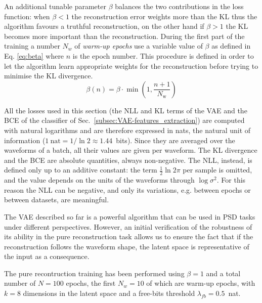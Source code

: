 An additional tunable parameter $\beta$ balances the two contributions in the loss function: when $\beta < 1$ the reconstruction error weights more than the \ac{KL} thus the algorithm favours a truthful reconstruction, on the other hand if $\beta > 1$ the \ac{KL} becomes more important than the reconstruction. During the first part of the training a number $N_w$ of \textit{warm-up epochs} use a variable value of $\beta$ as defined in Eq. \ref{eq:beta} where $n$ is the epoch number. This procedure is defined in order to let the algorithm learn appropriate weights for the reconstruction before trying to minimise the \ac{KL} divergence.
\begin{equation}
    \label{eq:beta}
    \beta(n) = \beta \cdot \min\left(1, \frac{n+1}{N_{\text{w}}}\right)
\end{equation}

All the losses used in this section (the \ac{NLL} and \ac{KL} terms of the \ac{VAE} and the \ac{BCE} of the classifier of Sec.~\ref{subsec:VAE-features_extraction}) are computed with natural logarithms and are therefore expressed in nats, the natural unit of information ($1~\text{nat} = 1/\ln 2 \approx 1.44$~bits). Since they are averaged over the waveforms of a batch, all their values are given per waveform. The \ac{KL} divergence and the \ac{BCE} are absolute quantities, always non-negative. The \ac{NLL}, instead, is defined only up to an additive constant: the term $\frac{1}{2}\ln 2\pi$ per sample is omitted, and the value depends on the units of the waveforms through $\log \sigma^2$. For this reason the \ac{NLL} can be negative, and only its variations, e.g. between epochs or between datasets, are meaningful.

The \ac{VAE} described so far is a powerful algorithm that can be used in \ac{PSD} tasks under different perspectives. However, an initial verification of the robustness of its ability in the pure reconstruction task allows us to ensure the fact that if the reconstruction follows the waveform shape, the latent space is representative of the input as a consequence.

The pure recontruction training has been performed using $\beta=1$ and a total number of $N=100$ epochs, the first $N_w = 10$ of which are warm-up epochs, with $k = 8$ dimensions in the latent space and a free-bits threshold $\lambda_{fb} = 0.5$~nat.

